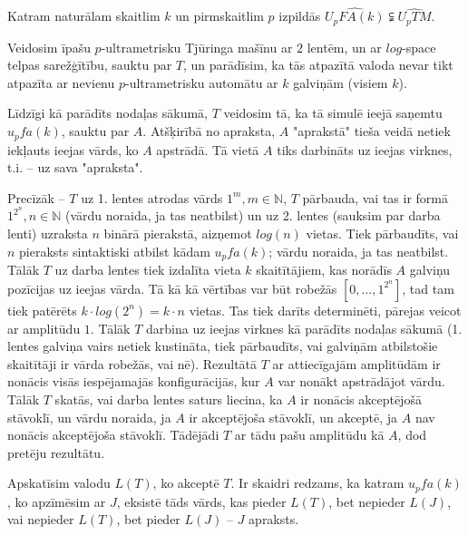 \documentclass{ludis}
\begin{document}
\begin{teorema}
Katram naturālam skaitlim $k$ un pirmskaitlim $p$ izpildās $\widehat{U_pFA(k)} \subsetneqq \widehat{U_pTM}$.
\end{teorema}
\begin{pieradijums}
Veidosim īpašu $p$-ultrametrisku Tjūringa mašīnu ar $2$ lentēm, un ar $log$-space telpas sarežģītību, sauktu par $T$, un parādīsim, ka tās atpazītā valoda nevar tikt atpazīta ar nevienu $p$-ultrametrisku automātu ar $k$ galviņām (visiem $k$).

Līdzīgi kā parādīts nodaļas sākumā, $T$ veidosim tā, ka tā simulē ieejā saņemtu $u_pfa(k)$, sauktu par $A$. Atšķirībā no apraksta, $A$ "aprakstā" tieša veidā netiek iekļauts ieejas vārds, ko $A$ apstrādā. Tā vietā $A$ tiks darbināts uz ieejas virknes, t.i. -- uz sava "apraksta".

Precīzāk -- $T$ uz 1. lentes atrodas vārds $1^m, m \in \mathbb{N}$, $T$ pārbauda, vai tas ir formā $1^{2^n}, n \in \mathbb{N}$ (vārdu noraida, ja tas neatbilst) un uz 2. lentes (sauksim par darba lenti) uzraksta $n$ binārā pierakstā, aizņemot $log(n)$ vietas. Tiek pārbaudīts, vai $n$ pieraksts sintaktiski atbilst kādam $u_pfa(k)$; vārdu noraida, ja tas neatbilst. Tālāk $T$ uz darba lentes tiek izdalīta vieta $k$ skaitītājiem, kas norādīs $A$ galviņu pozīcijas uz ieejas vārda. Tā kā kā vērtības var būt robežās $\left[0, \ldots, 1^{2^n} \right]$, tad tam tiek patērēts $k \cdot log(2^n)= k \cdot n$ vietas. %
Tas tiek darīts determinēti, pārejas veicot ar amplitūdu $1$. Tālāk $T$ darbina uz ieejas virknes kā parādīts nodaļas sākumā (1. lentes galviņa vairs netiek kustināta, tiek pārbaudīts, vai galviņām atbilstošie skaitītāji ir vārda robežās, vai nē). Rezultātā $T$ ar attiecīgajām amplitūdām ir nonācis visās iespējamajās konfigurācijās, kur $A$ var nonākt apstrādājot vārdu. Tālāk $T$ skatās, vai darba lentes saturs liecina, ka $A$ ir nonācis akceptējošā stāvoklī, un vārdu noraida, ja $A$ ir akceptējoša stāvoklī, un akceptē, ja $A$ nav nonācis akceptējoša stāvoklī. Tādējādi $T$ ar tādu pašu amplitūdu kā $A$, dod pretēju rezultātu.

Apskatīsim valodu $L(T)$, ko akceptē $T$. Ir skaidri redzams, ka katram $u_pfa(k)$, ko apzīmēsim ar $J$, eksistē tāds vārds, kas pieder $L(T)$, bet nepieder $L(J)$, vai nepieder $L(T)$, bet pieder $L(J)$ -- $J$ apraksts.
\end{pieradijums}

\printbibliography
\end{document}
